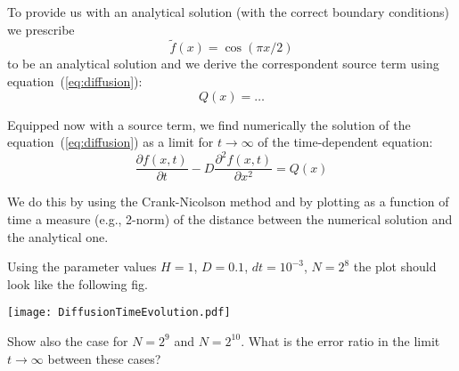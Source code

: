 \documentclass[10pt]{article}
\begin{document}
To provide us with an analytical solution (with the correct boundary conditions) we prescribe 
%
\begin{equation}
\tilde f(x) = \cos(\pi x / 2)
\end{equation}
%
to be an analytical solution and we derive the correspondent source term using equation~(\ref{eq:diffusion}):
%
\begin{equation}
Q(x) = \dots 
\end{equation}

Equipped now with a source term, we find numerically the solution of the equation~(\ref{eq:diffusion}) as a limit for $t \rightarrow \infty$ of the time-dependent equation:
%
\begin{equation}
\frac{\partial f(x,t)}{\partial t} -D \frac{\partial^2 f(x,t)}{\partial x^2} = Q(x)
\end{equation}

We do this by using the Crank-Nicolson method and by plotting as a function of time a measure (e.g., 2-norm) of the distance between the numerical solution and the analytical one.

\begin{question}
Using the parameter values $H = 1$, $D = 0.1$, $dt = 10^{-3}$, $N = 2^8$ the plot should look like the following fig.
\end{question}

\begin{center}
\texttt{[image: DiffusionTimeEvolution.pdf]}
\end{center}

\begin{question}
Show also the case for $N = 2^9$ and $N = 2^{10}$. What is the error ratio in the limit $t \rightarrow \infty$ between these cases?
\end{question}
\end{document}
